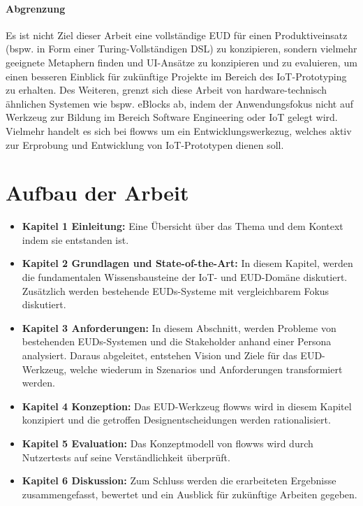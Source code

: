\paragraph{Abgrenzung} Es ist nicht Ziel dieser Arbeit eine vollständige \ac{EUD} für einen Produktiveinsatz (bspw. in Form einer Turing-Vollständigen \ac{DSL}) zu konzipieren, sondern vielmehr geeignete Metaphern finden und \ac{UI}-Ansätze zu konzipieren und zu evaluieren, um einen besseren Einblick für zukünftige Projekte im Bereich des \ac{IoT}-Prototyping zu erhalten. Des Weiteren, grenzt sich diese Arbeit von hardware-technisch ähnlichen Systemen wie bspw. eBlocks \cite{Phalke.2010} ab, indem der Anwendungsfokus nicht auf Werkzeug zur Bildung im Bereich Software Engineering oder \ac{IoT} gelegt wird. Vielmehr handelt es sich bei flowws um ein Entwicklungswerkezug, welches aktiv zur Erprobung und Entwicklung von \ac{IoT}-Prototypen dienen soll.

\section{Aufbau der Arbeit}\label{sec:1_aufbau}
\begin{itemize}
    \item \textbf{Kapitel 1 Einleitung:} Eine Übersicht über das Thema und dem Kontext indem sie entstanden ist.
    \item \textbf{Kapitel 2 Grundlagen und State-of-the-Art:} In diesem Kapitel, werden die fundamentalen Wissensbausteine der \ac{IoT}- und \ac{EUD}-Domäne diskutiert. Zusätzlich werden bestehende \acp{EUD}-Systeme mit vergleichbarem Fokus diskutiert.
    \item \textbf{Kapitel 3 Anforderungen:} In diesem Abschnitt, werden Probleme von bestehenden \acp{EUD}-Systemen und die Stakeholder anhand einer Persona analysiert. Daraus abgeleitet, entstehen Vision und Ziele für das \ac{EUD}-Werkzeug, welche wiederum in Szenarios und Anforderungen transformiert werden.
    \item \textbf{Kapitel 4 Konzeption:} Das \ac{EUD}-Werkzeug flowws wird in diesem Kapitel konzipiert und die getroffen Designentscheidungen werden rationalisiert.
    \item \textbf{Kapitel 5 Evaluation:} Das Konzeptmodell von flowws wird durch Nutzertests auf seine Verständlichkeit überprüft.
    \item \textbf{Kapitel 6 Diskussion:} Zum Schluss werden die erarbeiteten Ergebnisse zusammengefasst, bewertet und ein Ausblick für zukünftige Arbeiten gegeben.
\end{itemize}